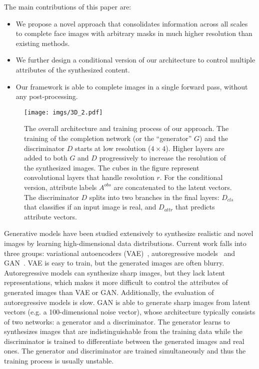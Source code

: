 \documentclass[acmtog,timestamp]{acmart}
\begin{document}
The main contributions of this paper are:
\begin{itemize}
  \item We propose a novel approach that consolidates information across all scales to complete face images with arbitrary masks in much higher resolution than existing methods. 
  \item We further design a conditional version of our architecture to control multiple attributes of the synthesized content.
  \item Our framework is able to complete images in a single forward pass, without any post-processing.
\end{itemize}\begin{figure*}
      \centering
      \begin{minipage}{1.0\textwidth}
          \centering
          \texttt{[image: imgs/3D\_2.pdf]}
      \end{minipage}\hfill
	 \caption{The overall architecture and training process of our approach. The training of the completion network (or the ``generator'' $G$) and the discriminator $D$ starts at low resolution ($4\times4$). Higher layers are added to both $G$ and $D$ progressively to increase the resolution of the synthesized images. The  cubes in the figure represent convolutional layers that handle resolution $r$. For the conditional version, attribute labels $A^{obs}$ are concatenated to the latent vectors. The discriminator $D$ splits into two branches in the final layers: $D_{cls}$ that classifies if an input image is real, and $D_{attr}$ that predicts attribute vectors.}
     \label{fig:structure}
\end{figure*}%
Generative models have been studied extensively to synthesize realistic and novel images by learning high-dimensional data distributions. Current work falls into three groups: variational autoencoders (VAE)~\cite{kingma2013auto,kingma2016improved}, autoregressive models~\cite{oord2016pixel,van2016conditional} and GAN~\cite{goodfellow2014generative}. VAE is easy to train, but the generated images are often blurry. Autoregressive models can synthesize sharp images, but they lack latent representations, which makes it more difficult to control the attributes of generated images than VAE or GAN. Additionally, the evaluation of autoregressive models is slow. GAN is able to generate sharp images from latent vectors (e.g. a 100-dimensional noise vector), whose architecture typically consists of two networks: a generator and a discriminator. The generator learns to synthesizes images that are indistinguishable from the training data while the discriminator is trained to differentiate between the generated images and real ones. The generator and discriminator are trained simultaneously and thus the training process is usually unstable. 
\end{document}
